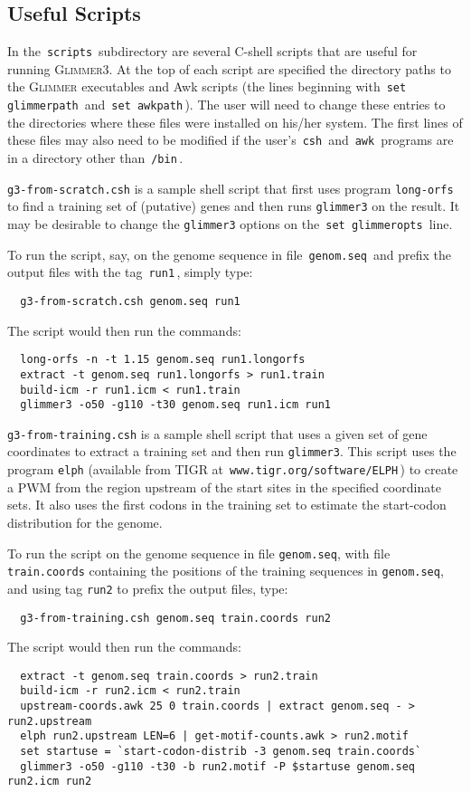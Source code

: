 \documentclass[fleqn,titlepage,11pt]{article}
\def\Glimmer{\textsc{Glimmer}}
\def\Gthree{\textsc{Glimmer3}}
\def\Pg#1{\texttt{#1}}
\begin{document}
\subsection{Useful Scripts}
  \label{script:sec}
In the \,\verb`scripts`\, subdirectory are several C-shell scripts that
are useful for running \Gthree{}.  At the top of each script
are specified the directory paths to the \Glimmer{} executables
and Awk scripts (the lines beginning with
\,\verb`set glimmerpath`\, and \,\verb`set awkpath`\,).
The user will need to change these entries to the directories
where these files were installed on his/her system.  The first
lines of these files may also need to be modified if the
user's \,\verb`csh`\, and \,\verb`awk`\, programs are in a directory
other than \,\verb`/bin`\,.

\bn\RaggedRight
\exdent
  \Pg{g3-from-scratch.csh} is a sample shell script that first uses
  program \Pg{long-orfs} to find a training set of (putative) genes
  and then runs \Pg{glimmer3} on the result.
  It may be desirable to change the \Pg{glimmer3} options
  on the \,\verb`set glimmeropts`\, line.

  To run the script, say, on the genome sequence in file
  \,\verb`genom.seq`\, and prefix the output files with the tag
  \,\verb`run1`\,, simply type:
\BSV\begin{verbatim}
  g3-from-scratch.csh genom.seq run1
\end{verbatim}\ESV
  The script would then run the commands:
\BSV\begin{verbatim}
  long-orfs -n -t 1.15 genom.seq run1.longorfs
  extract -t genom.seq run1.longorfs > run1.train
  build-icm -r run1.icm < run1.train
  glimmer3 -o50 -g110 -t30 genom.seq run1.icm run1
\end{verbatim}\ESV
  
\exdent
  \Pg{g3-from-training.csh} is a sample shell script that uses a
  given set of gene coordinates to extract a training set and
  then run \Pg{glimmer3}.  This script uses the program \Pg{elph}
  (available from TIGR at \,\verb`www.tigr.org/software/ELPH`\,)
  to create a PWM from the region upstream of the start sites
  in the specified coordinate sets.  It also uses the first codons
  in the training set to estimate the start-codon distribution for
  the genome.

  To run the script on the genome sequence in file
  \Pg{genom.seq}, with file \Pg{train.coords} containing the positions
  of the training sequences in \Pg{genom.seq}, and using tag \Pg{run2}
  to prefix the output files, type:
\BSV\begin{verbatim}
  g3-from-training.csh genom.seq train.coords run2
\end{verbatim}\ESV
  The script would then run the commands:
\BSV\begin{verbatim}
  extract -t genom.seq train.coords > run2.train
  build-icm -r run2.icm < run2.train
  upstream-coords.awk 25 0 train.coords | extract genom.seq - > run2.upstream
  elph run2.upstream LEN=6 | get-motif-counts.awk > run2.motif
  set startuse = `start-codon-distrib -3 genom.seq train.coords`
  glimmer3 -o50 -g110 -t30 -b run2.motif -P $startuse genom.seq run2.icm run2
\end{verbatim}\ESV
\end{document}
